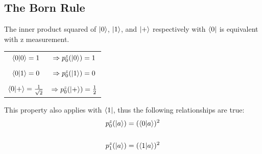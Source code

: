 \documentclass[hidelinks, a4paper, 12pt]{article}
\newcommand{\n}{\\[\baselineskip]}
\newcommand{\thus}{\Rightarrow}
\begin{document}
        \subsection{The Born Rule}
            The inner product squared of $\ket{0}$, $\ket{1}$, and $\ket{+}$ respectively with $\bra{0}$ is equivalent with z measurement.
            \begin{center}
                \begin{tabular}{c c}
                $\braket{0|0} = 1$ & $\thus p_0^z(\ket{0}) = 1$\\
                \\
                $\braket{0|1} = 0$ & $\thus p_0^z(\ket{1}) = 0$\\
                \\
                $\braket{0|+} = \frac{1}{\sqrt{2}}$ & $\thus p_0^z(\ket{+}) = \frac{1}{2}$\\
               \end{tabular}
            \end{center}
            This property also applies with $\bra{1}$, thus the following relationships are true:
            \[\begin{split}
                p_0^z(\ket{a}) &= (\braket{0|a})^2\n
                p_1^z(\ket{a}) &= (\braket{1|a})^2\\
            \end{split}\]
\end{document}

